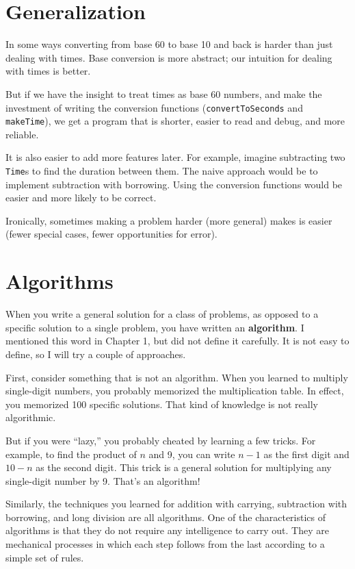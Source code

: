 \section{Generalization}

In some ways converting from base 60 to base 10 and back is
harder than just dealing with times.  Base conversion is more
abstract; our intuition for dealing with times is better.

But if we have the insight to treat times as base 60 numbers,
and make the investment of writing the conversion functions
({\tt convertToSeconds} and {\tt makeTime}), we get
a program that is shorter, easier to read and debug, and more
reliable.

It is also easier to add more features later.  For example, imagine
subtracting two {\tt Time}s to find the duration between them.  The
naive approach would be to implement subtraction with
borrowing.  Using the conversion functions would be easier and more
likely to be correct.

Ironically, sometimes making a problem harder (more general)
makes is easier (fewer special cases, fewer opportunities for error).

\section{Algorithms}
\label{algorithm}

When you write a general solution for a class of problems, as opposed
to a specific solution to a single problem, you have written an {\bf
algorithm}.  I mentioned this word in Chapter 1, but did not define it
carefully.  It is not easy to define, so I will try a couple of
approaches.

First, consider something that is not an algorithm.
When you learned to multiply single-digit numbers, you probably
memorized the multiplication table.  In effect, you memorized 100
specific solutions.  That kind of knowledge is not really algorithmic.

But if you were ``lazy,'' you probably cheated by learning a few
tricks.  For example, to find the product of $n$ and 9, you can write
$n-1$ as the first digit and $10-n$ as the second digit.  This trick
is a general solution for multiplying any single-digit number by 9.
That's an algorithm!

Similarly, the techniques you learned for addition with carrying,
subtraction with borrowing, and long division are all algorithms.  One
of the characteristics of algorithms is that they do not require any
intelligence to carry out.  They are mechanical processes in which
each step follows from the last according to a simple set of rules.

